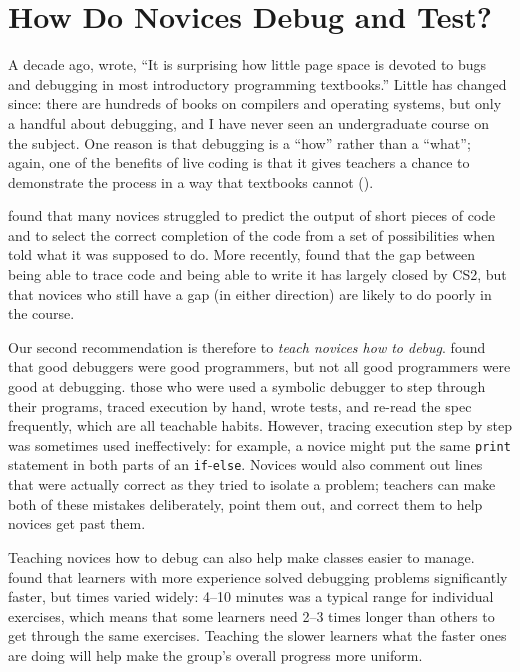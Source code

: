 \section{How Do Novices Debug and Test?}\label{s:pck-debug}

A decade ago, \cite{McCa2008} wrote, ``It is surprising how little
page space is devoted to bugs and debugging in most introductory
programming textbooks.''  Little has changed since: there are hundreds
of books on compilers and operating systems, but only a handful about
debugging, and I have never seen an undergraduate course on the
subject.  One reason is that debugging is a ``how'' rather than a
``what''; again, one of the benefits of live coding is that it gives
teachers a chance to demonstrate the process in a way that textbooks
cannot ().

\cite{List2004,List2009} found that many novices struggled to predict
the output of short pieces of code and to select the correct
completion of the code from a set of possibilities when told what it
was supposed to do.  More recently, \cite{Harr2018} found that the gap
between being able to trace code and being able to write it has
largely closed by CS2, but that novices who still have a gap (in
either direction) are likely to do poorly in the course.

Our second recommendation is therefore to \emph{teach novices how to
  debug}.  \cite{Fitz2008,Murp2008} found that good debuggers were
good programmers, but not all good programmers were good at debugging.
those who were used a symbolic debugger to step through their
programs, traced execution by hand, wrote tests, and re-read the spec
frequently, which are all teachable habits. However, tracing execution
step by step was sometimes used ineffectively: for example, a novice
might put the same \texttt{print} statement in both parts of an
\texttt{if}-\texttt{else}.  Novices would also comment out lines that
were actually correct as they tried to isolate a problem; teachers can
make both of these mistakes deliberately, point them out, and correct
them to help novices get past them.

Teaching novices how to debug can also help make classes easier to
manage.  \cite{Alqa2017} found that learners with more experience
solved debugging problems significantly faster, but times varied
widely: 4--10 minutes was a typical range for individual exercises,
which means that some learners need 2--3 times longer than others to
get through the same exercises.  Teaching the slower learners what the
faster ones are doing will help make the group's overall progress more
uniform.

